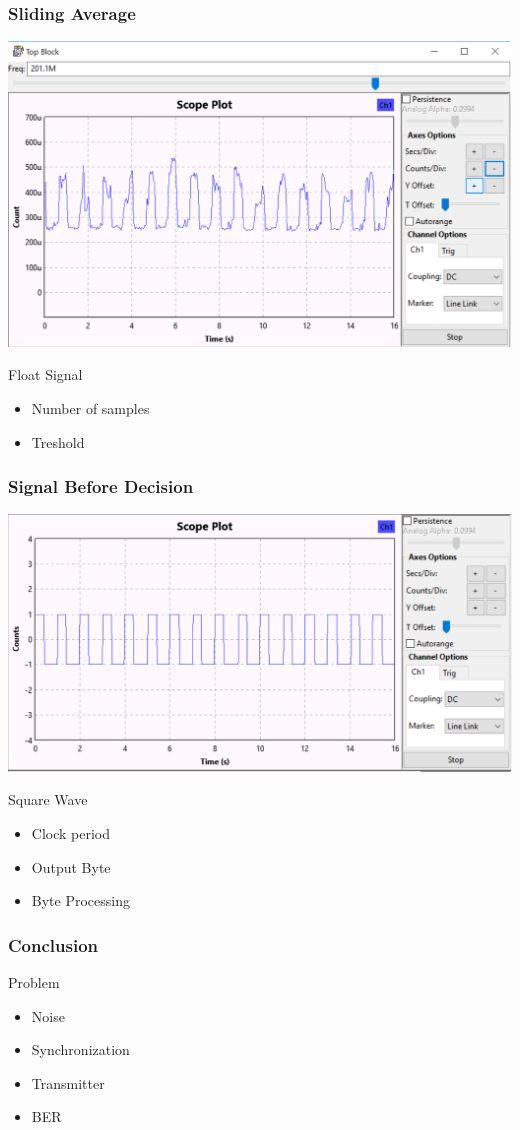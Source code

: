 \begin{frame}
	\frametitle{Sliding Average}
	\centering \includegraphics[scale=.2]{images/apres_average.png}
	\begin{block}{Float Signal}
		\begin{itemize}
			\item Number of samples
			\item Treshold
		\end{itemize}
	\end{block}
\end{frame}

\begin{frame}
	\frametitle{Signal Before Decision}
	\centering \includegraphics[scale=.2]{images/apres_add_const.png}
	\begin{block}{Square Wave}
		\begin{itemize}
			\item Clock period
			\item Output Byte
			\item Byte Processing
		\end{itemize}
	\end{block}
\end{frame}

\begin{frame}
	\frametitle{Conclusion}
	\begin{block}{Problem}
		\begin{itemize}
			\item Noise
			\item Synchronization
			\item Transmitter
			\item BER
		\end{itemize}
	\end{block}
\end{frame}
